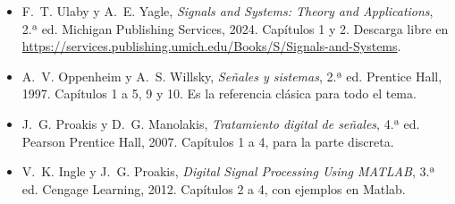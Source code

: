 \documentclass[11pt,a4paper]{scrartcl}
\begin{document}
\begin{itemize}
  \item F.~T. Ulaby y A.~E. Yagle, \emph{Signals and Systems: Theory and Applications}, 2.ª ed. Michigan Publishing Services, 2024. Capítulos 1 y 2. Descarga libre en \url{https://services.publishing.umich.edu/Books/S/Signals-and-Systems}.
  \item A.~V. Oppenheim y A.~S. Willsky, \emph{Señales y sistemas}, 2.ª ed. Prentice Hall, 1997. Capítulos 1 a 5, 9 y 10. Es la referencia clásica para todo el tema.
  \item J.~G. Proakis y D.~G. Manolakis, \emph{Tratamiento digital de señales}, 4.ª ed. Pearson Prentice Hall, 2007. Capítulos 1 a 4, para la parte discreta.
  \item V.~K. Ingle y J.~G. Proakis, \emph{Digital Signal Processing Using MATLAB}, 3.ª ed. Cengage Learning, 2012. Capítulos 2 a 4, con ejemplos en Matlab.
\end{itemize}
\end{document}
